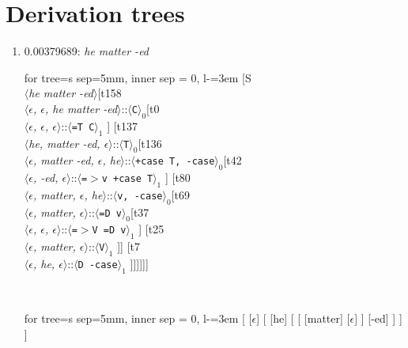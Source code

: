 \documentclass[11pt]{article}
\begin{document}
\section{Derivation trees}
\begin{enumerate}
	\item  0.00379689: \textit{he matter -ed} \\[0.5em]
	\begin{adjustbox}{max width = \textwidth}
	\begin{forest}
	for tree={s sep=5mm, inner sep = 0, l-=3em}
	[S\\$\langle$\textit{he matter -ed}$\rangle$[t158\\$\langle$\textit{$\epsilon${,} $\epsilon${,} he matter -ed}$\rangle$::$\langle$\texttt{C}$\rangle_0$[t0\\$\langle$\textit{$\epsilon${,} $\epsilon${,} $\epsilon$}$\rangle$::$\langle$\texttt{{=}T C}$\rangle_1$ ] [t137\\$\langle$\textit{he{,} matter -ed{,} $\epsilon$}$\rangle$::$\langle$\texttt{T}$\rangle_0$[t136\\$\langle$\textit{$\epsilon${,} matter -ed{,} $\epsilon${,} he}$\rangle$::$\langle$\texttt{+case T{,} -case}$\rangle_0$[t42\\$\langle$\textit{$\epsilon${,} -ed{,} $\epsilon$}$\rangle$::$\langle$\texttt{{=}$>$v +case T}$\rangle_1$ ] [t80\\$\langle$\textit{$\epsilon${,} matter{,} $\epsilon${,} he}$\rangle$::$\langle$\texttt{v{,} -case}$\rangle_0$[t69\\$\langle$\textit{$\epsilon${,} matter{,} $\epsilon$}$\rangle$::$\langle$\texttt{{=}D v}$\rangle_0$[t37\\$\langle$\textit{$\epsilon${,} $\epsilon${,} $\epsilon$}$\rangle$::$\langle$\texttt{{=}$>$V {=}D v}$\rangle_1$ ] [t25\\$\langle$\textit{$\epsilon${,} matter{,} $\epsilon$}$\rangle$::$\langle$\texttt{V}$\rangle_1$ ]] [t7\\$\langle$\textit{$\epsilon${,} he{,} $\epsilon$}$\rangle$::$\langle$\texttt{D -case}$\rangle_1$ ]]]]]]
	\end{forest}
	\end{adjustbox}
	\\
	\begin{adjustbox}{max width = \textwidth}
	\begin{forest}
	for tree={s sep=5mm, inner sep = 0, l-=3em}
	[ [$\epsilon$] [ [he] [ [ [matter] [$\epsilon$] ] [-ed] ] ] ]
	\end{forest}
	\end{adjustbox}
	\newpage


\end{enumerate}
\end{document}
